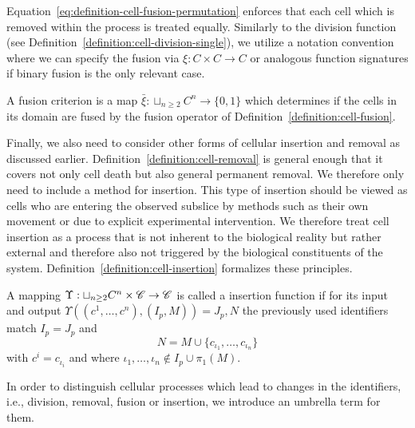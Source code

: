 Equation~\eqref{eq:definition-cell-fusion-permutation} enforces that each cell which is removed
within the process is treated equally.
Similarly to the division function (see Definition~\ref{definition:cell-division-single}), we
utilize a notation convention where we can specify the fusion via $\xi:C\times C\rightarrow C$ or
analogous function signatures if binary fusion is the only relevant case.

\begin{definition}
    A fusion criterion is a map $\bar{\xi}:\sqcup_{n\geq 2}C^n\rightarrow\{0,1\}$ which determines
    if the cells in its domain are fused by the fusion operator of
    Definition~\ref{definition:cell-fusion}.
    \label{definition:cell-fusion-criterion}
\end{definition}

Finally, we also need to consider other forms of cellular insertion and removal as discussed
earlier.
Definition~\ref{definition:cell-removal} is general enough that it covers not only cell death but
also general permanent removal.
We therefore only need to include a method for insertion.
This type of insertion should be viewed as cells who are entering the observed subslice by methods
such as their own movement or due to explicit experimental intervention.
We therefore treat cell insertion as a process that is not inherent to the biological reality but
rather external and therefore also not triggered by the biological constituents of the system.
Definition~\ref{definition:cell-insertion} formalizes these principles.

\begin{definition}
    A mapping $\Upsilon:\sqcup_{n\geq2}C^n\times\mathscr{C}\rightarrow\mathscr{C}$ is called a insertion function if
    for its input and output $\Upsilon((c^1,\dots,c^n),(I_p,M))=J_p,N$ the previously used
    identifiers match $I_p=J_p$ and
    \begin{equation}
        N = M\cup\{c_{\iota_1},\dots,c_{\iota_n}\}
    \end{equation}
    with $c^i=c_{\iota_i}$ and where $\iota_1,\dots,\iota_n\notin I_p\cup\pi_1(M)$.
    \label{definition:cell-insertion}
\end{definition}

In order to distinguish cellular processes which lead to changes in the identifiers, i.e., division,
removal, fusion or insertion, we introduce an umbrella term for them.

